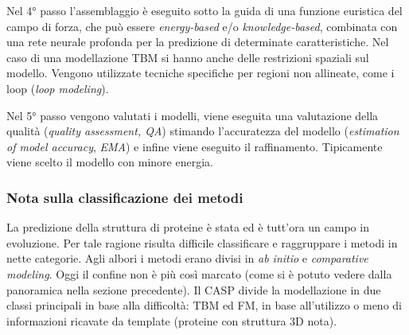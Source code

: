 {\par Nel 4° passo l'assemblaggio è eseguito sotto la guida di una funzione euristica del campo di forza, che può essere \textit{energy-based} e/o \textit{knowledge-based}, combinata con una rete neurale profonda per la predizione di determinate caratteristiche. Nel caso di una modellazione TBM si hanno anche delle restrizioni spaziali sul modello. Vengono utilizzate tecniche specifiche per regioni non allineate, come i loop (\textit{loop modeling}). \\

\par Nel 5° passo vengono valutati i modelli, viene eseguita una valutazione della qualità (\textit{quality assessment, QA}) stimando l'accuratezza del modello (\textit{estimation of model accuracy}, \textit{EMA}) e infine viene eseguito il raffinamento. Tipicamente viene scelto il modello con minore energia.

\subsubsection{Nota sulla classificazione dei metodi}

La predizione della struttura di proteine è stata ed è tutt'ora un campo in evoluzione. Per tale ragione risulta difficile classificare e raggruppare i metodi in nette categorie. Agli albori i metodi erano divisi in \textit{ab initio} e \textit{comparative modeling}. Oggi il confine non è più così marcato (come si è potuto vedere dalla panoramica nella sezione precedente). Il CASP divide la modellazione in due classi principali in base alla difficoltà: TBM ed FM\supercite{kryshtafovych2021critical}, in base all'utilizzo o meno di informazioni ricavate da template (proteine con struttura 3D nota). 

}
